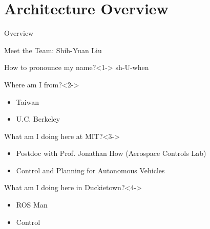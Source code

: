 \documentclass[aspectratio=43]{beamer}
\begin{document}
\section{Architecture Overview}
\begin{frame}[label=overview]{Overview}
	\tableofcontents[sectionstyle=show/shaded,subsectionstyle=show/shaded/shaded]
\end{frame}

\begin{frame}{Meet the Team: Shih-Yuan Liu}
	\begin{block}{How to pronounce my name?}<1->
		sh-U-when
	\end{block}
	\begin{block}{Where am I from?}<2->
		\begin{itemize}
			\item Taiwan
			\item U.C. Berkeley
		\end{itemize}
	\end{block}
	\begin{block}{What am I doing here at MIT?}<3->
		\begin{itemize}
			\item Postdoc with Prof. Jonathan How (Aerospace Controls Lab)
			\item Control and Planning for Autonomous Vehicles
		\end{itemize}
	\end{block}
	\begin{block}{What am I doing here in Duckietown?}<4->
		\begin{itemize}
			\item ROS Man
			\item Control
		\end{itemize}
	\end{block}
\end{frame}

\end{document}
